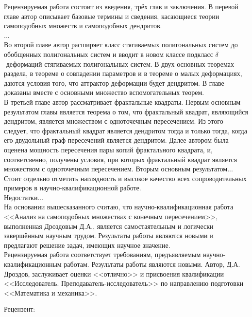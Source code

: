 \documentclass[oneside, 14pt, a4paper]{extreport}
\begin{document}
 
Рецензируемая работа состоит из введения, трёх глав и заключения.
В перевой главе автор описывает базовые термины и сведения, касающиеся теории самоподобных множеств и самоподобных дендритов.\\
...\\ 

Во второй главе автор расширяет класс стягиваемых полигональных систем до обобщенных полигональных систем и вводит в новом классе подкласс $\delta$-деформаций стягиваемых полигональных систем. 
В двух основных теоремах раздела, в теореме о совпадении параметров и в теореме о малых деформациях, даются условия того, что аттрактор деформации будет дендритом. 
В главе доказаны вместе с основными множество вспомогательных теорем. \\

В третьей главе автор рассматривает фрактальные квадраты.
Первым основным результатом главы является теорема о том, что фрактальный квадрат, являющийся дендритом, является множеством с одноточечным пересечением.
Из этого следует, что фрактальный квадрат является дендритом тогда и только тогда, когда его двудольный граф пересечений является дендритом.
Далее автором была оценена мощность пересечения пары копий фрактального квадрата, и, соответсвенно, получены условия, при которых фрактальный квадрат является множеством с одноточечным пересечением.
Вторым основным результатом...\\
Стоит отдельно отметить наглядность и высокое качество всех сопроводительных примеров в научно-квалификационной работе.\\

Недостатки...\\

На основании вышесказанного считаю, что научно-квалификационная работа <<Анализ на самоподобных множествах с конечным пересечением>>, выполненная Дроздовым Д.А., является самостаятельным и логически завершённым научным трудом.
Результаты работы являются новыми и предлагают решение задач, имеющих научное значение.
\\

Рецензируемая работа соответствует требованиям, предъявляемым научно-квалификационным работам. 
Результаты работы являются новыми. 
Автор, Д.А. Дроздов, заслуживает оценки <<отлично>> и присвоения квалификации <<Исследователь. Преподаватель-исследователь>> по направлению подготовки <<Математика и механика>>.

\vspace{2cm}

Рецензент:\\
\end{document}
